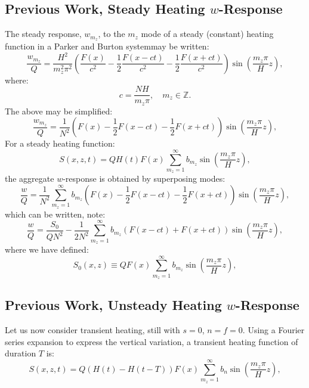 \documentclass[12pt]{article}
\begin{document}
\subsection{ Previous Work, Steady Heating $w$-Response}
%
The steady response, $w_{m_z}$, to the $m_z$ mode of a steady (constant) heating function in a Parker and Burton systemmay be written:
%
\begin{equation}
\frac{w_{m_z} }{Q} = \frac{H^2}{m_z^2 \pi^2} \left( \frac{F(x)}{c^2} - \frac{1}{2} \frac{F(x-ct)}{c^2 } - \frac{1}{2} \frac{F(x+ct)}{ c^2}   \right) \sin \left( \frac{m_z \pi} {H} z\right),
\end{equation}
%
where:
%
\begin{equation}
 c = \frac{N H}{ m_z \pi }, \quad m_z \in \mathbb{Z}.
\end{equation}
%
The above may be simplified:
%
\begin{equation}
\frac{w_{m_z} }{Q} = \frac{1}{N^2} \left( F(x) - \frac{1}{2} F(x-ct)  - \frac{1}{2} F(x+ct)   \right) \sin \left( \frac{m_z \pi} {H} z\right),
\end{equation}
%
For a steady heating function:
%
\begin{equation}
S(x,z,t) =Q H(t) F(x) \sum_{m_z=1}^{\infty} b_{m_z} \sin \left( \frac{m_z \pi} {H} z\right),
\end{equation}
%
the aggregate $w$-response is obtained by superposing modes:
%
\begin{equation}
\frac{w }{Q} = \frac{1}{N^2}  \sum_{m_z = 1}^{\infty} b_{m_z} \left( F(x) - \frac{1}{2} F(x-ct)  - \frac{1}{2} F(x+ct)   \right) \sin \left( \frac{m_z \pi} {H} z\right),
\end{equation}
%
which can be written, note:
%
\begin{equation}
\frac{w }{Q} =  \frac{S_0}{Q N^2} - \frac{1}{2 N^2}  \sum_{m_z = 1}^{\infty} b_{m_z} \left(F(x-ct) + F(x+ct)   \right) \sin \left( \frac{m_z \pi} {H} z\right),
\end{equation}
%
where we have defined:
%
\begin{equation}
S_0 (x,z)  \equiv Q F(x) \sum_{m_z=1}^{\infty} b_{m_z} \sin \left( \frac{m_z \pi} {H} z\right),
\end{equation}
%
\subsection{ Previous Work, Unsteady Heating $w$-Response}
%
%
%
Let us now consider transient heating, still with $s=0$, $n = f = 0$. Using a Fourier series expansion to express the vertical variation, a transient heating function of duration $T$ is:
%
\begin{equation}
\label{equ_1}
S(x,z,t) =Q (H(t) - H(t-T) ) F(x) \sum_{m_z=1}^{\infty} b_n \sin \left( \frac{m_z \pi} {H} z\right),
\end{equation}
\end{document}
